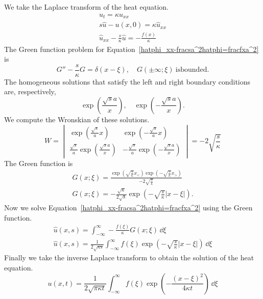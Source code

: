 {%
\begin{Solution}
  We take the Laplace transform of the heat equation.
  \begin{gather}
    \nonumber
    u_{t} = \kappa u_{x x}
    \\
    \nonumber
    s \hat{u} - u(x,0) = \kappa \hat{u}_{x x} 
    \\
    \label{hatphi_xx-fracsa^2hatphi=fracfxa^2}
    \hat{u}_{x x} - \frac{s}{\kappa} \hat{u} = - \frac{f(x)}{\kappa}
  \end{gather}
  The Green function problem for
  Equation~\ref{hatphi_xx-fracsa^2hatphi=fracfxa^2} is
  \[
  G'' - \frac{s}{\kappa} G = \delta(x-\xi), \quad G(\pm \infty; \xi)\ \mathrm{is bounded}.
  \]
  The homogeneous solutions that satisfy the left and right boundary
  conditions are, respectively,
  \[
  \exp \left( \frac{ \sqrt{s}{a} } x \right), \quad
  \exp \left( - \frac{ \sqrt{s}{a} } x \right).
  \]
  We compute the Wronskian of these solutions.
  \[
  W = 
  \begin{vmatrix}
    \exp \left( \frac{ \sqrt{s} }{a} x \right) & 
    \exp \left( - \frac{ \sqrt{s} }{a} x \right) 
    \\
    \frac{ \sqrt{s} }{a} \exp \left( \frac{ \sqrt{s}{a} } x \right) & 
    - \frac{ \sqrt{s} }{a} \exp \left( - \frac{ \sqrt{s}{a} } x \right)
  \end{vmatrix}
  = - 2 \sqrt{ \frac{s}{\kappa} }
  \]
  The Green function is
  \begin{gather*}
    G(x;\xi) = \frac{ \exp \left( \sqrt{ \frac{s}{\kappa} } x_< \right)
      \exp \left( - \sqrt{ \frac{s}{\kappa} } x_> \right) }
    { - 2 \sqrt{ \frac{s}{\kappa} } } 
    \\
    G(x;\xi) = - \frac{ \sqrt{\kappa} }{ 2 \sqrt{s} }
    \exp \left( - \sqrt{ \frac{s}{\kappa} } |x-\xi| \right).
  \end{gather*}
  Now we solve Equation~\ref{hatphi_xx-fracsa^2hatphi=fracfxa^2} 
  using the Green function.
  \begin{gather*}
    \hat{u}(x,s) = \int_{-\infty}^\infty - \frac{ f(\xi) }{ \kappa } G(x;\xi) \,\dd \xi 
    \\
    \hat{u}(x,s) = \frac{1}{2 \sqrt{\kappa s}} \int_{-\infty}^{\infty}
    f(\xi) \exp \left(- \sqrt{ \frac{s}{\kappa} } | x - \xi| \right) \,\dd \xi
  \end{gather*}
  Finally we take the inverse Laplace transform to obtain the 
  solution of the heat equation.
  \[
  \boxed{
    u(x,t) = \frac{1}{2  \sqrt{\pi \kappa t} } \int_{-\infty}^{\infty}
    f(\xi) \exp\left( - \frac{(x-\xi)^2}{4 \kappa t} \right) \,\dd \xi
    }
  \]
\end{Solution}






}
